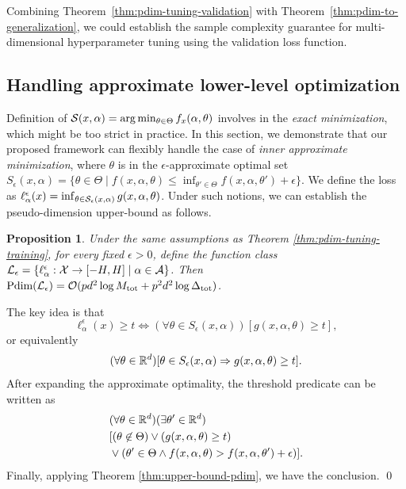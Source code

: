 \documentclass{article}
\theoremstyle{plain}
\newtheorem{proposition}[theorem]{Proposition}
\theoremstyle{definition}
\theoremstyle{remark}
\begin{document}
Combining Theorem~\ref{thm:pdim-tuning-validation} with Theorem~\ref{thm:pdim-to-generalization}, we could establish the sample complexity guarantee for multi-dimensional hyperparameter tuning using the validation loss function. 

    \subsection{Handling approximate lower-level optimization}
    Definition of $\mathcal{S}(x, \alpha) = \arg \min_{\theta \in \Theta}f_x(\alpha, \theta)$ involves in the \textit{exact minimization}, which might be too strict in practice. In this section, we demonstrate that our proposed framework can flexibly handle the case of \textit{inner approximate minimization}, where $\theta$ is in the $\epsilon$-approximate optimal set $S_\epsilon(x, \alpha) = \{\theta \in \Theta \mid f(x, \alpha, \theta) \leq \inf_{\theta' \in \Theta}f(x, \alpha, \theta') + \epsilon\}$. We define the loss as $\ell_{\alpha}^\epsilon(x) = \inf_{\theta \in \mathcal{S}_\epsilon(x, \alpha)} g(x, \alpha, \theta)$. Under such notions, we can establish the pseudo-dimension upper-bound as follows.
    \begin{proposition}
        Under the same assumptions as Theorem \ref{thm:pdim-tuning-training}, for every fixed $\epsilon > 0$, define the function class $\mathcal{L}_\epsilon = \{\ell^\epsilon_\alpha: \mathcal{X} \rightarrow [-H, H] \mid \alpha \in \mathcal{A}\}$. Then $\text{\normalfont Pdim}(\mathcal{L}_\epsilon) = \mathcal{O}(pd^2\log M_\textup{tot} + p^2d^2 \log \Delta_\textup{tot})$.
    \end{proposition}
    \proof
        The key idea is that
        \[
            \ell^{\epsilon}_\alpha(x) \geq t \Leftrightarrow (\forall \theta \in S_{\epsilon}(x, \alpha))[g(x, \alpha, \theta) \geq t],
        \]
        or equivalently
        \[
            (\forall \theta \in \mathbb{R}^d) [\theta \in S_\epsilon(x, \alpha) \Rightarrow g(x, \alpha, \theta) \geq t].
        \]
        After expanding the approximate optimality, the threshold predicate can be written as
        \begin{equation*}
            \begin{aligned}
                 &(\forall \theta \in \mathbb{R}^d)(\exists \theta' \in \mathbb{R}^d)\\
                 &[(\theta \not \in \Theta) \lor (g(x, \alpha, \theta) \geq t) \\
                 &\lor (\theta' \in \Theta \land f(x, \alpha, \theta) > f(x, \alpha, \theta') + \epsilon)].
            \end{aligned}
        \end{equation*}
        Finally, applying Theorem \ref{thm:upper-bound-pdim}, we have the conclusion.
    \qed
\end{document}
